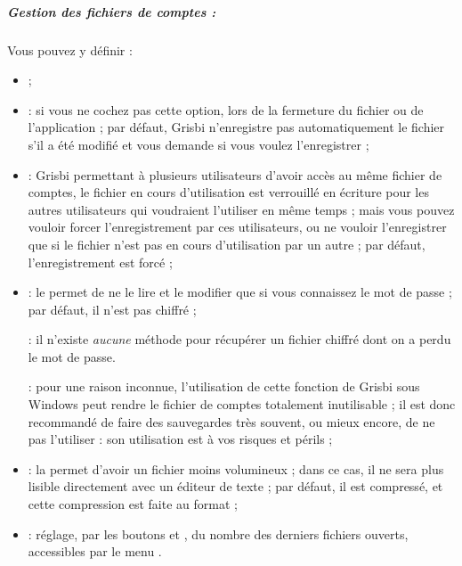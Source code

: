 \subparagraph{Gestion des fichiers de comptes :\label{setup-general-files-manage}}

Vous pouvez y définir :

\begin{itemize}
	\item {} ;
	\item {} : si vous ne cochez pas cette option, lors de la fermeture du fichier ou de l'application ; par défaut, Grisbi n'enregistre pas automatiquement le fichier s'il a été modifié et vous demande si vous voulez l'enregistrer ;
	\item {} : Grisbi permettant à plusieurs utilisateurs d'avoir accès au même fichier de comptes, le fichier en cours d'utilisation est verrouillé en écriture pour les autres utilisateurs qui voudraient l'utiliser en même temps ; mais vous pouvez vouloir forcer l'enregistrement par ces utilisateurs, ou ne vouloir l'enregistrer que si le fichier n'est pas en cours d'utilisation par un autre ; par défaut, l'enregistrement est forcé ;
	\item {} : le  permet de ne le lire et le modifier que si vous connaissez le mot de passe ; par défaut, il n'est pas chiffré ;

	 : il n'existe \emph{aucune} méthode pour récupérer un fichier chiffré dont on a perdu le mot de passe.

	 : pour une raison inconnue, l'utilisation de cette fonction de Grisbi sous Windows peut rendre le fichier de comptes totalement inutilisable ; il est donc recommandé de faire des sauvegardes très souvent, ou mieux encore, de ne pas l'utiliser : son utilisation est à vos risques et périls ;
	\item {} : la   permet d'avoir un fichier moins volumineux ; dans ce cas, il ne sera plus lisible directement avec un éditeur de texte ; par défaut, il est compressé, et cette compression est faite au format  ;
	\item {} : réglage, par les boutons \menu{+} et \menu{-}, du nombre des derniers fichiers ouverts, accessibles par le menu .
\end{itemize}

